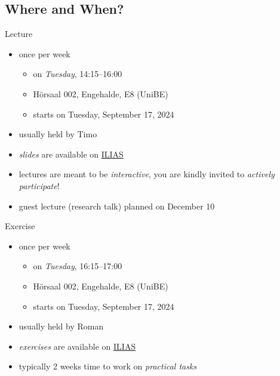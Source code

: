 \subsection{Where and When?}

\begin{frame}{\myframetitle}
	\begin{mycolumns}
		\begin{definition}{Lecture}
			\begin{itemize}
				\item once per week
				\begin{itemize}
					\item on \emph{Tuesday}, 14:15--16:00
					\item Hörsaal 002, Engehalde, E8 (UniBE)
					\item starts on Tuesday, September 17, 2024
				\end{itemize}
				\item usually held by Timo
				\item \emph{slides} are available on \href{https://ilias.unibe.ch/ilias.php?baseClass=ilrepositorygui&cmd=infoScreenGoto&ref_id=3112374}{ILIAS}
				\item lectures are meant to be \emph{interactive}, you are kindly invited to \emph{actively participate}!
				\item guest lecture (research talk) planned on December 10
			\end{itemize}
		\end{definition}
	\mynextcolumn
		\begin{example}{Exercise}
			\begin{itemize}
				\item once per week 
				\begin{itemize}
					\item on \emph{Tuesday}, 16:15--17:00
					\item Hörsaal 002, Engehalde, E8 (UniBE)
					\item starts on Tuesday, September 17, 2024
				\end{itemize}
				\item usually held by Roman
				\item \emph{exercises} are available on \href{https://ilias.unibe.ch/ilias.php?baseClass=ilrepositorygui&cmd=infoScreenGoto&ref_id=3112374}{ILIAS}
				\item typically 2 weeks time to work on \emph{practical tasks}
			\end{itemize}
		\end{example}
	\end{mycolumns}
\end{frame}

